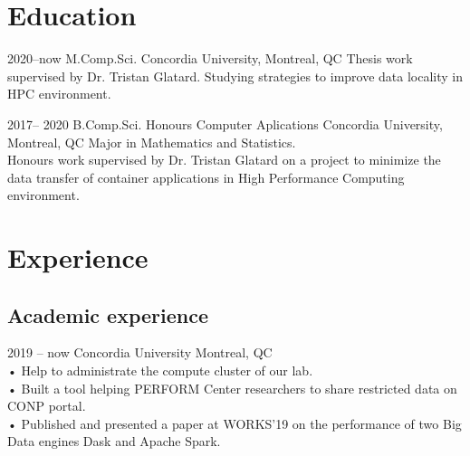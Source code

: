 \documentclass[]{friggeri-cv} %
\begin{document}
\section{Education}
\begin{entrylist}
																											
																											
	\entry
	{2020--now}
	{M.Comp.Sci.}
	{Concordia University, Montreal, QC}
	{Thesis work supervised by Dr. Tristan Glatard. 
	Studying strategies to improve data locality in HPC environment.}
																											
																											
	\entry
	{2017-- 2020}
	{B.Comp.Sci. {\normalfont Honours Computer Aplications}}
	{Concordia University, Montreal, QC}
	{Major in Mathematics and Statistics.\\
		Honours work supervised by Dr. Tristan Glatard on a project to minimize 
		the data transfer of container applications in High Performance 
	Computing environment.}
																											
																											
\end{entrylist}


\section{Experience}

\subsection{Academic experience}
\begin{entrylist}
																											
																											
	\entry
	{2019 -- now}
	{Concordia University}
	{Montreal, QC}
	{ \\
		• Help to administrate the compute cluster of our lab.\\
		• Built a tool helping PERFORM Center researchers to share restricted 
		data on CONP portal.\\
		• Published and presented a paper at WORKS'19 on the performance of two 
		Big Data engines Dask and Apache Spark.
	}
																											
																											
\end{entrylist}
\end{document}
